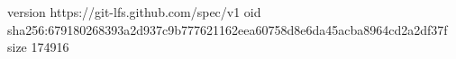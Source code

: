 version https://git-lfs.github.com/spec/v1
oid sha256:679180268393a2d937c9b777621162eea60758d8e6da45acba8964cd2a2df37f
size 174916

